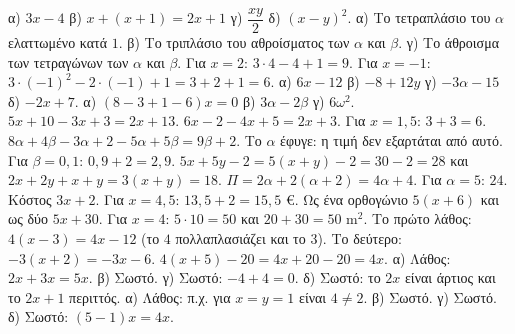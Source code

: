  α) $3x-4$ \quad β) $x+(x+1)=2x+1$ \quad γ) $\dfrac{xy}{2}$ \quad δ) $(x-y)^2$.
 α) Το τετραπλάσιο του $\alpha$ ελαττωμένο κατά $1$. \quad β) Το τριπλάσιο του αθροίσματος των $\alpha$ και $\beta$. \quad γ) Το άθροισμα των τετραγώνων των $\alpha$ και $\beta$.
 Για $x=2$: $3\cdot4-4+1=9$. Για $x=-1$: $3\cdot(-1)^2-2\cdot(-1)+1=3+2+1=6$.
 α) $6x-12$ \quad β) $-8+12y$ \quad γ) $-3\alpha-15$ \quad δ) $-2x+7$.
 α) $(8-3+1-6)x=0$ \quad β) $3\alpha-2\beta$ \quad γ) $6\omega^2$.
 $5x+10-3x+3=2x+13$.
 $6x-2-4x+5=2x+3$. Για $x=1{,}5$: $3+3=6$.
 $8\alpha+4\beta-3\alpha+2-5\alpha+5\beta=9\beta+2$. Το $\alpha$ έφυγε: η τιμή δεν εξαρτάται από αυτό. Για $\beta=0{,}1$: $0{,}9+2=2{,}9$.
 $5x+5y-2=5(x+y)-2=30-2=28$ και $2x+2y+x+y=3(x+y)=18$.
 $\Pi=2\alpha+2(\alpha+2)=4\alpha+4$. Για $\alpha=5$: $24$.
 Κόστος $3x+2$. Για $x=4{,}5$: $13{,}5+2=15{,}5$ €.
 Ως ένα ορθογώνιο $5(x+6)$ και ως δύο $5x+30$. Για $x=4$: $5\cdot10=50$ και $20+30=50$ m$^2$.
 Το πρώτο λάθος: $4(x-3)=4x-12$ (το $4$ πολλαπλασιάζει και το $3$). Το δεύτερο: $-3(x+2)=-3x-6$.
 $4(x+5)-20=4x+20-20=4x$.
 α) Λάθος: $2x+3x=5x$. \quad β) Σωστό. \quad γ) Σωστό: $-4+4=0$. \quad δ) Σωστό: το $2x$ είναι άρτιος και το $2x+1$ περιττός.
 α) Λάθος: π.χ. για $x=y=1$ είναι $4\neq2$. \quad β) Σωστό. \quad γ) Σωστό. \quad δ) Σωστό: $(5-1)x=4x$.
